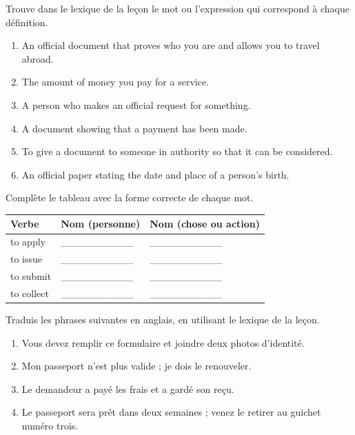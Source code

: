 \documentclass[11pt]{article}
\newcounter{popsec}
\newcounter{popsub}
\newcommand{\courssub}[1]{%
  \stepcounter{popsub}%
  \par\vspace{9pt}\noindent{\popxbold\fontsize{11.5}{13}\selectfont\color{popink}{\color{poporange}\thepopsec.\thepopsub}\hspace{6pt}#1}\par\nopagebreak\vspace{4pt}
}
\begin{document}
\begin{exercice}
Trouve dans le lexique de la leçon le mot ou l'expression qui correspond à chaque définition.

\begin{enumerate}
\item An official document that proves who you are and allows you to travel abroad.
\item The amount of money you pay for a service.
\item A person who makes an official request for something.
\item A document showing that a payment has been made.
\item To give a document to someone in authority so that it can be considered.
\item An official paper stating the date and place of a person's birth.
\end{enumerate}
\end{exercice}

\begin{exercice}
Complète le tableau avec la forme correcte de chaque mot.

\begin{center}
\begin{tabular}{|l|l|l|}
\hline
\rowcolor{popblueL} Verbe & Nom (personne) & Nom (chose ou action) \\
\hline
to apply & \_\_\_\_\_\_\_\_\_\_ & \_\_\_\_\_\_\_\_\_\_ \\
\hline
to issue & \_\_\_\_\_\_\_\_\_\_ & \_\_\_\_\_\_\_\_\_\_ \\
\hline
to submit & \_\_\_\_\_\_\_\_\_\_ & \_\_\_\_\_\_\_\_\_\_ \\
\hline
to collect & \_\_\_\_\_\_\_\_\_\_ & \_\_\_\_\_\_\_\_\_\_ \\
\hline
\end{tabular}
\end{center}
\end{exercice}

\courssub{Je m'entraîne}

\begin{exercice}[Traduction]
Traduis les phrases suivantes en anglais, en utilisant le lexique de la leçon.

\begin{enumerate}
\item Vous devez remplir ce formulaire et joindre deux photos d'identité.
\item Mon passeport n'est plus valide ; je dois le renouveler.
\item Le demandeur a payé les frais et a gardé son reçu.
\item Le passeport sera prêt dans deux semaines ; venez le retirer au guichet numéro trois.
\end{enumerate}
\end{exercice}
\end{document}

